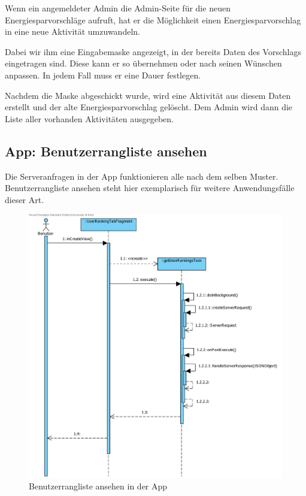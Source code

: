 Wenn ein angemeldeter Admin die Admin-Seite für die neuen Energiesparvorschläge aufruft, hat er die Möglichkeit einen Energiesparvorschlag in eine neue Aktivität umzuwandeln.

Dabei wir ihm eine Eingabemaske angezeigt, in der bereits Daten des Vorschlags eingetragen sind. Diese kann er so übernehmen oder nach seinen Wünschen anpassen. In jedem Fall muss er eine Dauer festlegen.

Nachdem die Maske abgeschickt wurde, wird eine Aktivität aus diesem Daten erstellt und der alte Energiesparvorschlag gelöscht. Dem Admin wird dann die Liste aller vorhanden Aktivitäten ausgegeben.



\subsection{App: Benutzerrangliste ansehen}
Die Serveranfragen in der App funktionieren alle nach dem selben
Muster. Benutzerrangliste ansehen steht hier exemplarisch für weitere
Anwendungsfälle dieser Art.

\begin{figure}[H]
  \centering
  \includegraphics[width=\textwidth, clip]{gfx/Ranking_App}
  \caption{Benutzerrangliste ansehen in der App}
\end{figure}

